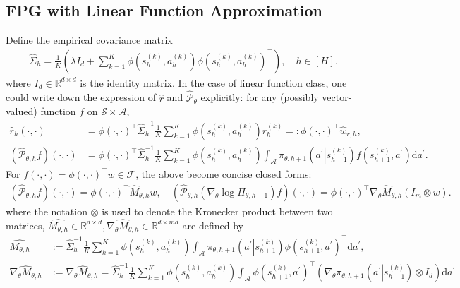\documentclass{article}
\numberwithin{equation}{section}
\begin{document}
\subsection{FPG with Linear Function Approximation}
Define the empirical covariance matrix
\begin{align*}
    \widehat{\Sigma}_h=\frac{1}{K}\left(\lambda I_d+\sum_{k=1}^K\phi\left(s_h^{(k)}, a_h^{(k)}\right)\phi\left(s_h^{(k)}, a_h^{(k)}\right)^\top\right),\quad h\in[H]. 
\end{align*}
where $I_d\in\mathbb{R}^{d\times d}$ is the identity matrix. In the case of linear function class, one could write down the expression of $\widehat{r}$ and $\widehat{\mathcal{P}}_\theta$ explicitly: for any (possibly vector-valued) function $f$ on $\mathcal{S}\times\mathcal{A}$,
\begin{align}
    \label{wr}
    \widehat{r}_h(\cdot,\cdot)&=\phi(\cdot,\cdot)^\top\widehat{\Sigma}_h^{-1}\frac{1}{K}\sum_{k=1}^K\phi\left(s_h^{(k)},a_h^{(k)}\right)r_h^{(k)}=:\phi(\cdot,\cdot)^\top\widehat{w}_{r,h},\\
    \left(\widehat{\mathcal{P}}_{\theta,h} f\right)(\cdot,\cdot)&=\phi(\cdot,\cdot)^\top\widehat{\Sigma}^{-1}_h\frac{1}{K}\sum_{k=1}^K\phi\left(s_h^{(k)},a_h^{(k)}\right)\int_{\mathcal{A}}\pi_{\theta,h+1}\left(a^\prime\left\vert s_{h+1}^{(k)}\right.\right)f\left(s_{h+1}^{(k)}, a^\prime\right)\mathrm{d}a^\prime.\nonumber
\end{align}
For $f(\cdot,\cdot)=\phi(\cdot,\cdot)^\top w\in\mathcal{F}$, the above become concise closed forms: 
\begin{align*}
    \left(\widehat{\mathcal{P}}_{\theta,h} f\right)(\cdot,\cdot)=\phi(\cdot,\cdot)^\top\widehat{M}_{\theta,h} w,\quad \left(\widehat{\mathcal{P}}_{\theta,h}\left(\nabla_\theta\log\Pi_{\theta,h+1}\right)f\right)(\cdot,\cdot)=\phi(\cdot,\cdot)^\top\widehat{\nabla_\theta M_{\theta,h}}\left(I_m \otimes w\right).
\end{align*}
where the notation $\otimes$ is used to denote the Kronecker product between two matrices, $\widehat{M_{\theta,h}}\in\mathbb{R}^{d\times d}, \widehat{\nabla_\theta M_{\theta,h}}\in\mathbb{R}^{d\times md}$ are defined by
\begin{align}
    \label{M}
	\widehat{M_{\theta,h}}&:=\widehat{\Sigma}_h^{-1}\frac{1}{K}\sum_{k=1}^K\phi\left(s_h^{(k)}, a_h^{(k)}\right)\int_{\mathcal{A}}\pi_{\theta,h+1}\left(a^\prime\left\vert s_{h+1}^{(k)}\right.\right)\phi\left(s_{h+1}^{(k)}, a^\prime\right)^\top\mathrm{d}a^\prime,\\
	\label{gM}
	\widehat{\nabla_\theta M_{\theta,h}}&:=\nabla_\theta\widehat{M}_{\theta,h}=\widehat{\Sigma}_h^{-1}\frac{1}{K}\sum_{k=1}^K\phi\left(s_h^{(k)},a_h^{(k)}\right)\int_{\mathcal{A}}\phi\left(s_{h+1}^{(k)}, a^\prime\right)^\top\left(\nabla_\theta\pi_{\theta,h+1}\left(a^\prime\left\vert s_{h+1}^{(k)}\right.\right)\otimes I_d\right)\mathrm{d}a^\prime
\end{align}
\end{document}
